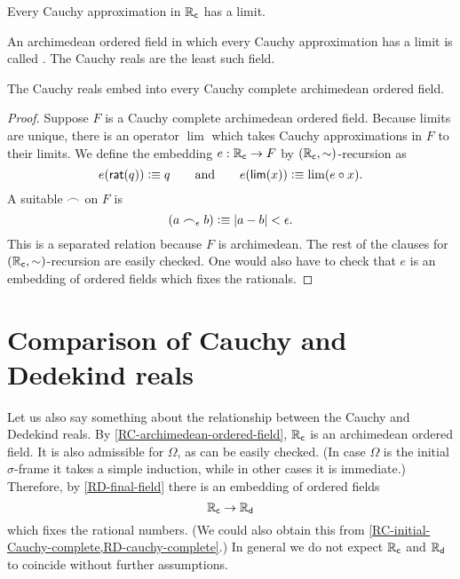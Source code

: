 \begin{thm}
  Every Cauchy approximation in $\mathbb{R}_\mathsf{c}$ has a limit.
\end{thm}

An archimedean ordered field in which every Cauchy approximation has a limit is called
.
%
%
%
The Cauchy reals are the least such field.

\begin{thm} \label{RC-initial-Cauchy-complete}
  The Cauchy reals embed into every Cauchy complete ar\-chi\-me\-de\-an ordered field.
\end{thm}

\begin{proof}
  Suppose $F$ is a Cauchy complete archimedean ordered field. Because limits are unique,
  there is an operator $\lim$ which takes Cauchy approximations in $F$ to their limits. We
  define the embedding $e : \mathbb{R}_\mathsf{c} \to F$ by $(\mathbb{R}_\mathsf{c}, {\mathord\sim})$-recursion as
  \begin{equation*}
    e(\mathsf{rat}(q)) \vcentcolon\equiv q
    \qquad\text{and}\qquad
    e(\mathsf{lim}(x)) \vcentcolon\equiv \lim (e \circ x).
  \end{equation*}
  A suitable $\frown$ on $F$ is
  \begin{equation*}
    (a \frown_\epsilon b) \vcentcolon\equiv |a - b| < \epsilon.
  \end{equation*}
  This is a separated relation because $F$ is archimedean. The rest of the clauses for
  $(\mathbb{R}_\mathsf{c}, {\mathord\sim})$-recursion are easily checked. One would also have to check that $e$ is
  an embedding of ordered fields which fixes the rationals.
\end{proof}

%

\section{Comparison of Cauchy and Dedekind reals}
\label{sec:comp-cauchy-dedek}

%
%

Let us also say something about the relationship between the Cauchy and Dedekind reals. By
\autoref{RC-archimedean-ordered-field}, $\mathbb{R}_\mathsf{c}$ is an archimedean ordered field. It is also
admissible for $\Omega$, as can be easily checked. (In case $\Omega$ is the initial
$\sigma$-frame
%
%
it takes a simple induction, while in other cases it is immediate.)
Therefore, by \autoref{RD-final-field} there is an embedding of ordered fields
%
\begin{equation*}
  \mathbb{R}_\mathsf{c} \to \mathbb{R}_\mathsf{d}
\end{equation*}
%
which fixes the rational numbers.
(We could also obtain this from \autoref{RC-initial-Cauchy-complete,RD-cauchy-complete}.)
In general we do not expect $\mathbb{R}_\mathsf{c}$ and $\mathbb{R}_\mathsf{d}$ to coincide
without further assumptions. 

